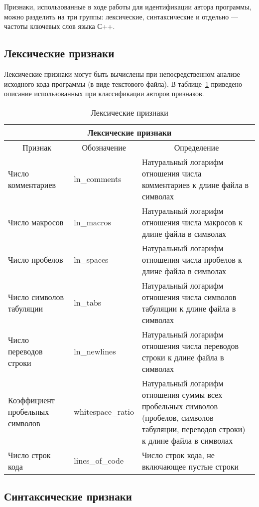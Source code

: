 Признаки, использованные в ходе работы для идентификации автора программы, можно разделить на три группы: лексические, синтаксические и отдельно --- частоты ключевых слов языка С++.

\subsection{Лексические признаки}

Лексические признаки могут быть вычислены при непосредственном анализе исходного кода программы (в виде текстового файла). В таблице~\ref{tab:1} приведено описание использованных при классификации авторов признаков.

\begin{table}[h!]
\caption{ Лексические признаки }
\label{tab:1}
\begin{center}
\begin{tabularx}{\linewidth}{|X|X|X|}
\hline
\multicolumn{3}{|c|}{Лексические признаки} \\
\hline
\multicolumn{1}{|c|}{Признак} & \multicolumn{1}{|c|}{Обозначение} & \multicolumn{1}{|c|}{Определение} \\
\hline
Число комментариев & ln\_comments & Натуральный логарифм отношения числа комментариев к длине файла в символах \\
\hline
Число макросов & ln\_macros & Натуральный логарифм отношения числа макросов к длине файла в символах \\
\hline
Число пробелов & ln\_spaces & Натуральный логарифм отношения числа пробелов к длине файла в символах \\
\hline
Число символов табуляции & ln\_tabs & Натуральный логарифм отношения числа символов табуляции к длине файла в символах \\
\hline
Число переводов строки & ln\_newlines & Натуральный логарифм отношения числа переводов строки к длине файла в символах \\
\hline
Коэффициент пробельных символов & whitespace\_ratio & Натуральный логарифм отношения суммы всех пробельных символов (пробелов, символов табуляции, переводов строки) к длине файла в символах \\
\hline
Число строк кода & lines\_of\_code & Число строк кода, не включающее пустые строки\\
\hline
\end{tabularx}
\end{center}
\end{table}

\subsection{Синтаксические признаки}

